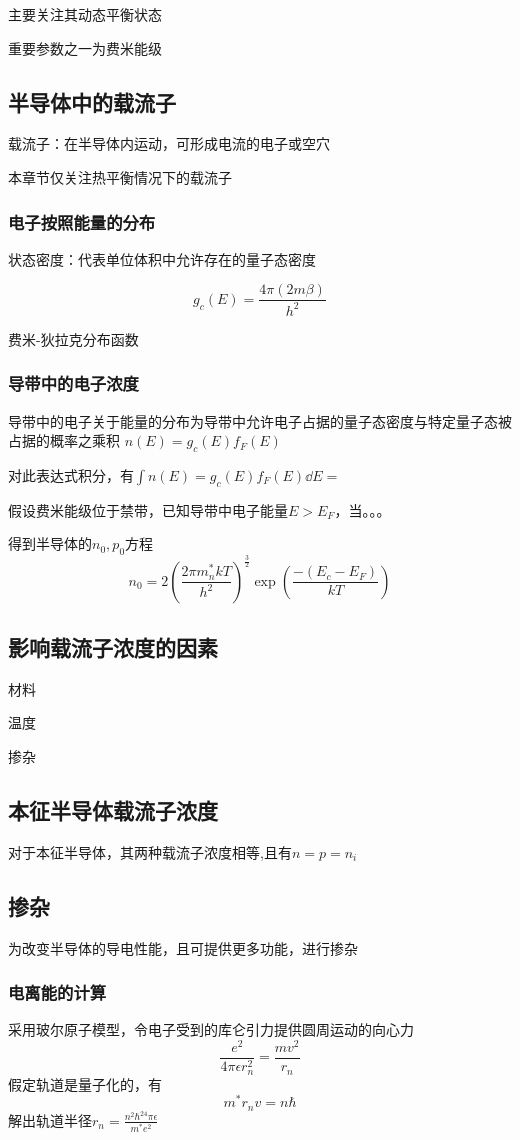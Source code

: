 \documentclass[12pt]{ctexart}
\begin{document}
主要关注其动态平衡状态

重要参数之一为费米能级

\subsection{半导体中的载流子}
载流子：在半导体内运动，可形成电流的电子或空穴

本章节仅关注热平衡情况下的载流子
\subsubsection{电子按照能量的分布}
状态密度：代表单位体积中允许存在的量子态密度

$$ g_c(E)=\frac{4 \pi (2m \beta)}{h^2}$$



费米-狄拉克分布函数

\subsubsection{导带中的电子浓度}
 导带中的电子关于能量的分布为导带中允许电子占据的量子态密度与特定量子态被占据的概率之乘积
 $n(E)=g_c(E)f_F(E)$

 对此表达式积分，有$\int n(E)=g_c(E)f_F(E) \dd E=$
 
 假设费米能级位于禁带，已知导带中电子能量$E>E_F$，当。。。

 得到半导体的$n_0,p_0$方程
 $$n_0=2\left(\frac{2\pi m_n^* kT}{h^2}\right)^\frac{3}{2} \exp(\frac{-(E_c-E_F)}{kT})$$

 \subsection{影响载流子浓度的因素}
 材料

 温度

 掺杂
\subsection{本征半导体载流子浓度}

对于本征半导体，其两种载流子浓度相等,且有$n=p=n_i$


\subsection{掺杂}
为改变半导体的导电性能，且可提供更多功能，进行掺杂
\subsubsection{电离能的计算}
采用玻尔原子模型，令电子受到的库仑引力提供圆周运动的向心力
$$\frac{e^2}{4\pi \epsilon r_n^2}=\frac{mv^2}{r_n}$$
假定轨道是量子化的，有
$$m^* r_nv=n\hbar$$
解出轨道半径$r_n=\frac{n^2\hbar^24\pi \epsilon }{m^* e^2}$
\end{document}
